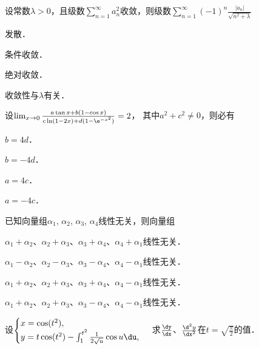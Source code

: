 \documentclass[plain,noanswer,medmath]{../../template/jnuexam}
\begin{document}
\begin{problem}
设常数$\lambda > 0$，且级数$\sum_{n = 1}^{\infty}a_n^2$收敛，则级数$\sum_{n = 1}^{\infty}(- 1)^n\frac{|a_n|}{\sqrt{n^2 + \lambda}}$\pickout{}
\begin{abcd}
\item 发散．                               
\item 条件收敛．
\item 绝对收敛．                           
\item 收敛性与$\lambda$有关．
\end{abcd}
\end{problem}


\begin{problem}
设$\lim_{x \to 0} \frac{a\tan x + b(1 - \cos x)}{c\ln(1 - 2x) + d(1 - \e^{- x^2})} = 2$，
其中$a^2 + c^2 \ne 0$，则必有\pickout{}
\begin{abcd}
\item $b = 4d$．    
\item $b = - 4d$．    
\item $a = 4c$．    
\item $a = - 4c$．
\end{abcd}
\end{problem}


\begin{problem}
已知向量组$\alpha_1$, $\alpha_2$, $\alpha_3$, $\alpha_4$线性无关，则向量组\pickout{}
\begin{abcd}
\item $\alpha_1 + \alpha_2$、$\alpha_2 + \alpha_3$、$\alpha_3 + \alpha_4$、$\alpha_4 + \alpha_1$线性无关．
\item $\alpha_1 - \alpha_2$、$\alpha_2 - \alpha_3$、$\alpha_3 - \alpha_4$、$\alpha_4 - \alpha_1$线性无关．
\item $\alpha_1 + \alpha_2$、$\alpha_2 + \alpha_3$、$\alpha_3 + \alpha_4$、$\alpha_4 - \alpha_1$线性无关．
\item $\alpha_1 + \alpha_2$、$\alpha_2 + \alpha_3$、$\alpha_3 - \alpha_4$、$\alpha_4 - \alpha_1$线性无关．
\end{abcd}
\end{problem}




\begin{problem}
设$\begin{cases}
 x = \cos(t^2), \\
 y = t\cos(t^2) - \int_1^{t^2} \frac{1}{2\sqrt{u}}\cos u\du,
\end{cases}$ 求$\frac{\dy}{\dx}$、$\frac{\d^2y}{\dx^2}$在$t = \sqrt{\frac{\pi}{2}}$的值．
\end{problem}
\end{document}
